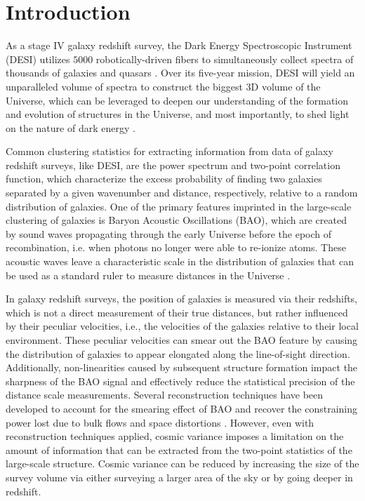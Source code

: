 \section{Introduction}
\label{sec:introduction}
As a stage IV galaxy redshift survey, the Dark Energy Spectroscopic Instrument (DESI) utilizes $5000$ robotically-driven fibers to simultaneously collect spectra of thousands of galaxies and quasars \citep{aghamousa2016desi}. Over its five-year mission, DESI will yield an unparalleled volume of spectra to construct the biggest 3D volume of the Universe, which can be leveraged to deepen our understanding of the formation and evolution of structures in the Universe, and most importantly, to shed light on the nature of dark energy \citep{2016arXiv161100036D}.

Common clustering statistics for extracting information from data of galaxy redshift surveys, like DESI, are the power spectrum and two-point correlation function, which characterize the excess probability of finding two galaxies separated by a given wavenumber and distance, respectively, relative to a random distribution of galaxies. One of the primary features imprinted in the large-scale clustering of galaxies is Baryon Acoustic Oscillations (BAO), which are created by sound waves propagating through the early Universe before the epoch of recombination, i.e. when photons no longer were able to re-ionize atoms. These acoustic waves leave a characteristic scale in the distribution of galaxies that can be used as a standard ruler to measure distances in the Universe \citep[see, e.g.,][]{1996ApJ...471..542H, 1998ApJ...496..605E, 2003ApJ...598..720S}.
 
In galaxy redshift surveys, the position of galaxies is measured via their redshifts, which is not a direct measurement of their true distances, but rather influenced by their peculiar velocities, i.e., the velocities of the galaxies relative to their local environment. These peculiar velocities can smear out the BAO feature by causing the distribution of galaxies to appear elongated along the line-of-sight direction. Additionally, non-linearities caused by subsequent structure formation impact the sharpness of the BAO signal and effectively reduce the statistical precision of the distance scale measurements. Several reconstruction techniques have been developed to account for the smearing effect of BAO and recover the constraining power lost due to bulk flows and space distortions \citep[see, e.g.,][]{Eisenstein_2007}. However, even with reconstruction techniques applied, cosmic variance imposes a limitation on the amount of information that can be extracted from the two-point statistics of the large-scale structure. Cosmic variance can be reduced by increasing the size of the survey volume via either surveying a larger area of the sky or by going deeper in redshift. 

